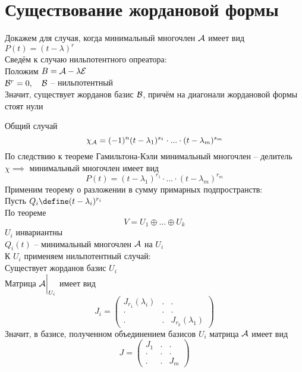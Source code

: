 \section{Существование жордановой формы}

\begin{iproof}
	\item Докажем для случая, когда минимальный многочлен $ \mathcal{A} $ имеет вид $ P(t) = (t - \lambda)^r $ \\
	Сведём к случаю нильпотентного опреатора: \\
	Положим $ B = \mathcal{A} - \lambda\mathcal{E} $ \\
	$ \mathcal{B}^r = 0, \quad \mathcal{B} $ -- нильпотентный \\
	Значит, существует жорданов базис $ \mathcal{B} $, причём на диагонали жордановой формы стоят нули
	\item Общий случай
	$$ \chi_{\mathcal{A}} = (-1)^n(t - \lambda_1)^{s_1} \cdot ... \cdot (t - \lambda_m)^{s_m} $$
	По следствию к теореме Гамильтона-Кэли минимальный многочлен -- делитель $ \chi \implies $ минимальный многочлен имеет вид
	$$ P(t) = (t - \lambda_1)^{r_1} \cdot ... \cdot (t - \lambda_m)^{r_m} $$
	Применим теорему о разложении в сумму примарных подпространств: \\
	Пусть $ Q_i \define (t - \lambda_i)^{r_i} $ \\
	По теореме
	$$ V = U_1 \oplus ... \oplus U_k $$
	$ U_i $ инвариантны \\
	$ Q_i(t) $ -- минимальный многочлен $ \mathcal{A} $ на $ U_i $ \\
	К $ U_i $ применяем нильпотентный случай: \\
	Существует жорданов базис $ U_i $ \\
	Матрица $ \mathcal{A}\bigg|_{U_i}^{} $ имеет вид
	$$ J_i =
	\begin{pmatrix}
		J_{r_1}(\lambda_i) & . & . \\
		. & . & . \\
		. & . & J_{r_k}(\lambda_1)
	\end{pmatrix} $$
	Значит, в базисе, полученном объединением базисов $ U_i $ матрица $ \mathcal{A} $ имеет вид
	$$ J =
	\begin{pmatrix}
		J_1 & . & . \\
		. & . & . \\
		. & . & J_m
	\end{pmatrix} $$
\end{iproof}

